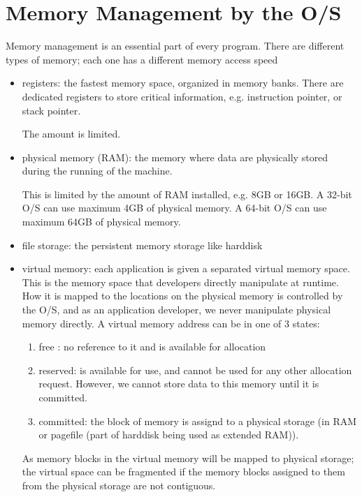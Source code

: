 \chapter{Memory Management by the O/S}
\label{chap:memory_management}

Memory management is an essential part of every program. There are different
types of memory; each one has a different memory access speed
\begin{itemize}
  \item registers: the fastest memory space, organized in memory banks. There
  are dedicated registers to store critical information, e.g. instruction
  pointer, or stack pointer.
  
  The amount is limited.
  
  \item physical memory (RAM): the memory where data are physically stored
  during the running of the machine.
  
  This is limited by the amount of RAM installed, e.g. 8GB or 16GB. A 32-bit O/S
  can use maximum 4GB of physical memory. A 64-bit O/S can use maximum 64GB of
  physical memory.
  
  \item file storage: the persistent memory storage like harddisk
    
  \item virtual memory: each application is given a separated virtual memory
  space. This is the memory space that developers directly manipulate at runtime. How
  it is mapped to the locations on the physical memory is controlled by the
  O/S, and as an application developer, we never manipulate physical memory
  directly. A virtual memory address can be in one of 3 states:
  \begin{enumerate}
    \item free : no reference to it and is available for allocation
    \item reserved: is available for use, and cannot be used for any other
    allocation request. However, we cannot store data to this memory until it is
    committed.
    \item committed: the block of memory is assignd to a physical storage (in
    RAM or pagefile (part of harddisk being used as extended RAM)).
  \end{enumerate}
  As memory blocks in the virtual memory will be mapped to physical storage; the
  virtual space can be fragmented if the memory blocks assigned to them from the
  physical storage are not contiguous.
  

\end{itemize}
